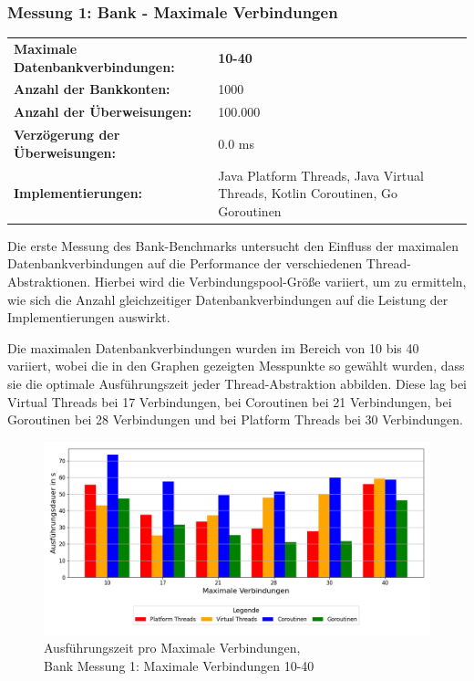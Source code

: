 \documentclass[fontsize=12pt,paper=a4,twoside=semi,parskip=half-,headsepline,headinclude]{scrreprt}
\begin{document}
\subsubsection{Messung 1: Bank - Maximale Verbindungen}

\begin{tabularx}{\textwidth}{@{}lX@{}}
	\textbf{Maximale Datenbankverbindungen:} & \textbf{10-40} \\
	\textbf{Anzahl der Bankkonten:} & 1000 \\
	\textbf{Anzahl der Überweisungen:} & 100.000 \\
	\textbf{Verzögerung der Überweisungen:} & 0.0 ms \\
	\textbf{Implementierungen:} & Java Platform Threads, Java Virtual Threads, Kotlin Coroutinen, Go Goroutinen
\end{tabularx}

Die erste Messung des Bank-Benchmarks untersucht den Einfluss der maximalen Datenbankverbindungen auf die Performance der verschiedenen Thread-Abstraktionen. Hierbei wird die Verbindungspool-Größe variiert, um zu ermitteln, wie sich die Anzahl gleichzeitiger Datenbankverbindungen auf die Leistung der Implementierungen auswirkt.

Die maximalen Datenbankverbindungen wurden im Bereich von 10 bis 40 variiert, wobei die in den Graphen gezeigten Messpunkte so gewählt wurden, dass sie die optimale Ausführungszeit jeder Thread-Abstraktion abbilden. Diese lag bei Virtual Threads bei 17 Verbindungen, bei Coroutinen bei 21 Verbindungen, bei Goroutinen bei 28 Verbindungen und bei Platform Threads bei 30 Verbindungen.

\begin{figure}[H]
	\centering
	\includegraphics[scale=0.5]{figures/bank/connections10-40/execution_time_plot.png}
	\caption{Ausführungszeit pro Maximale Verbindungen,\\ Bank Messung 1: Maximale Verbindungen 10-40}
	\label{fig:bankConnZeit}
\end{figure}
\end{document}
